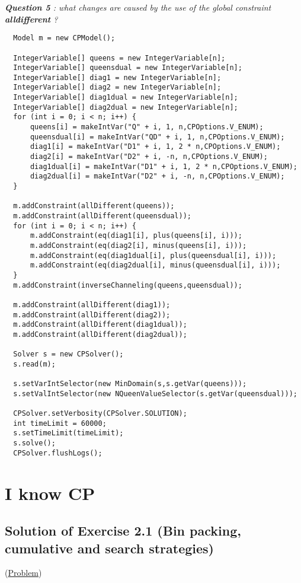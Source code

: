 \noindent\emph{\textbf{Question 5} : what changes are caused by the use of the global constraint \textbf{alldifferent} ?}

\begin{lstlisting}
  Model m = new CPModel();
	
  IntegerVariable[] queens = new IntegerVariable[n];
  IntegerVariable[] queensdual = new IntegerVariable[n];
  IntegerVariable[] diag1 = new IntegerVariable[n];
  IntegerVariable[] diag2 = new IntegerVariable[n];
  IntegerVariable[] diag1dual = new IntegerVariable[n];
  IntegerVariable[] diag2dual = new IntegerVariable[n];
  for (int i = 0; i < n; i++) {
      queens[i] = makeIntVar("Q" + i, 1, n,CPOptions.V_ENUM);
      queensdual[i] = makeIntVar("QD" + i, 1, n,CPOptions.V_ENUM);
      diag1[i] = makeIntVar("D1" + i, 1, 2 * n,CPOptions.V_ENUM);
      diag2[i] = makeIntVar("D2" + i, -n, n,CPOptions.V_ENUM);
      diag1dual[i] = makeIntVar("D1" + i, 1, 2 * n,CPOptions.V_ENUM);
      diag2dual[i] = makeIntVar("D2" + i, -n, n,CPOptions.V_ENUM);
  }
	
  m.addConstraint(allDifferent(queens));
  m.addConstraint(allDifferent(queensdual));
  for (int i = 0; i < n; i++) {
      m.addConstraint(eq(diag1[i], plus(queens[i], i)));
      m.addConstraint(eq(diag2[i], minus(queens[i], i)));
      m.addConstraint(eq(diag1dual[i], plus(queensdual[i], i)));
      m.addConstraint(eq(diag2dual[i], minus(queensdual[i], i)));
  }
  m.addConstraint(inverseChanneling(queens,queensdual));
	
  m.addConstraint(allDifferent(diag1));
  m.addConstraint(allDifferent(diag2));
  m.addConstraint(allDifferent(diag1dual));
  m.addConstraint(allDifferent(diag2dual));
	
  Solver s = new CPSolver();
  s.read(m);
	
  s.setVarIntSelector(new MinDomain(s,s.getVar(queens)));
  s.setValIntSelector(new NQueenValueSelector(s.getVar(queensdual)));
	
  CPSolver.setVerbosity(CPSolver.SOLUTION);
  int timeLimit = 60000;
  s.setTimeLimit(timeLimit);
  s.solve();
  CPSolver.flushLogs();
\end{lstlisting}

\section{I know CP}\label{solutions:iknowcp}\hypertarget{solutions:iknowcp}{}

\subsection{Solution of Exercise 2.1 (Bin packing, cumulative and search strategies)}\label{solutions:solutionofexercise2.1}\hypertarget{solutions:solutionofexercise2.1}{}
(\hyperlink{exercises:exercise2.1}{Problem})


